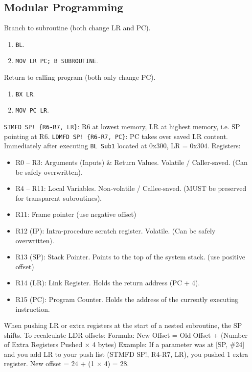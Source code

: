 \documentclass[../comorg-part1.tex]{subfiles}
\begin{document}
\subsection{Modular Programming}
Branch to subroutine (both change LR and PC).
\begin{enumerate}
    \item \texttt{BL}.
    \item \texttt{MOV LR PC; B SUBROUTINE}.
\end{enumerate}
Return to calling program (both only change PC).
\begin{enumerate}
    \item \texttt{BX LR}.
    \item \texttt{MOV PC LR}.
\end{enumerate}
\texttt{STMFD SP! \{R6-R7, LR\}}: R6 at lowest memory, LR at highest memory, i.e. SP pointing at R6.\newline
\texttt{LDMFD SP! \{R6-R7, PC\}}: PC takes over saved LR content.\newline
Immediately after executing \texttt{BL Sub1} located at 0x300, LR = 0x304.\newline
Registers:
\begin{itemize}
    \item R0 – R3: Arguments (Inputs) \& Return Values. Volatile / Caller-saved. (Can be safely overwritten).
    \item R4 – R11: Local Variables. Non-volatile / Callee-saved. (MUST be preserved for transparent subroutines).
    \item R11: Frame pointer (use negative offset)
    \item R12 (IP): Intra-procedure scratch register. Volatile. (Can be safely overwritten).
    \item R13 (SP): Stack Pointer. Points to the top of the system stack. (use positive offset)
    \item R14 (LR): Link Register. Holds the return address (PC + 4).
    \item R15 (PC): Program Counter. Holds the address of the currently executing instruction.
\end{itemize}
When pushing LR or extra registers at the start of a nested subroutine, the SP shifts. To recalculate LDR offsets:\newline
Formula: New Offset = Old Offset + (Number of Extra Registers Pushed × 4 bytes)\newline
Example: If a parameter was at [SP, \#24] and you add LR to your push list (STMFD SP!, {R4-R7, LR}), you pushed 1 extra register. New offset = 24 + (1 × 4) = 28.
\end{document}
